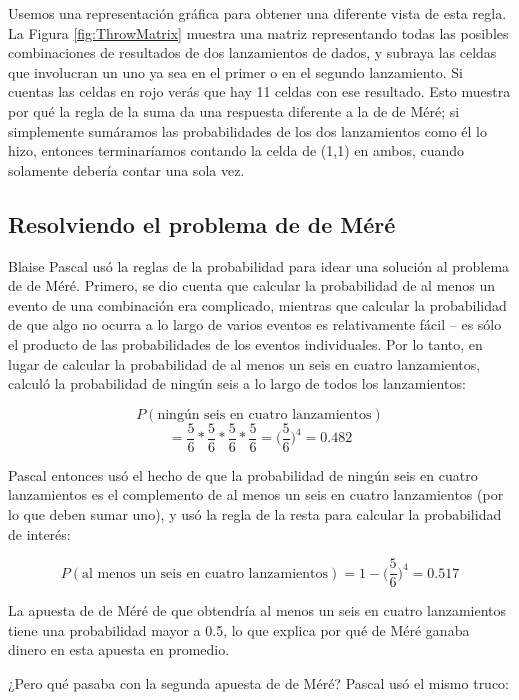\documentclass[
  12pt,
]{book}
\begin{document}
Usemos una representación gráfica para obtener una diferente vista de esta regla. La Figura \ref{fig:ThrowMatrix} muestra una matriz representando todas las posibles combinaciones de resultados de dos lanzamientos de dados, y subraya las celdas que involucran un uno ya sea en el primer o en el segundo lanzamiento. Si cuentas las celdas en rojo verás que hay 11 celdas con ese resultado. Esto muestra por qué la regla de la suma da una respuesta diferente a la de de Méré; si simplemente sumáramos las probabilidades de los dos lanzamientos como él lo hizo, entonces terminaríamos contando la celda de (1,1) en ambos, cuando solamente debería contar una sola vez.

\hypertarget{resolviendo-el-problema-de-de-muxe9ruxe9}{%
\subsection{Resolviendo el problema de de Méré}\label{resolviendo-el-problema-de-de-muxe9ruxe9}}

Blaise Pascal usó la reglas de la probabilidad para idear una solución al problema de de Méré. Primero, se dio cuenta que calcular la probabilidad de al menos un evento de una combinación era complicado, mientras que calcular la probabilidad de que algo no ocurra a lo largo de varios eventos es relativamente fácil -- es sólo el producto de las probabilidades de los eventos individuales. Por lo tanto, en lugar de calcular la probabilidad de al menos un seis en cuatro lanzamientos, calculó la probabilidad de ningún seis a lo largo de todos los lanzamientos:

\[
P(\text{ningún seis en cuatro lanzamientos})
\]
\[
= \frac{5}{6}*\frac{5}{6}*\frac{5}{6}*\frac{5}{6}=\bigg(\frac{5}{6}\bigg)^4=0.482
\]

Pascal entonces usó el hecho de que la probabilidad de ningún seis en cuatro lanzamientos es el complemento de al menos un seis en cuatro lanzamientos (por lo que deben sumar uno), y usó la regla de la resta para calcular la probabilidad de interés:

\[
P(\text{al menos un seis en cuatro lanzamientos}) = 1 - \bigg(\frac{5}{6}\bigg)^4=0.517
\]

La apuesta de de Méré de que obtendría al menos un seis en cuatro lanzamientos tiene una probabilidad mayor a 0.5, lo que explica por qué de Méré ganaba dinero en esta apuesta en promedio.

¿Pero qué pasaba con la segunda apuesta de de Méré? Pascal usó el mismo truco:
\end{document}
